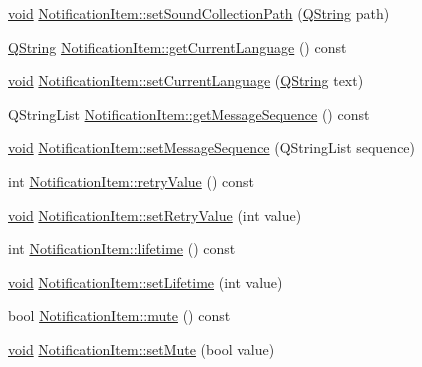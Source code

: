 \begin{DoxyCompactItemize}
\item 
\hyperlink{group___u_a_v_objects_plugin_ga444cf2ff3f0ecbe028adce838d373f5c}{void} \hyperlink{group___notify_plugin_ga51e72a159e74fc6c2f4575589caaf5b1}{\-Notification\-Item\-::set\-Sound\-Collection\-Path} (\hyperlink{group___u_a_v_objects_plugin_gab9d252f49c333c94a72f97ce3105a32d}{\-Q\-String} path)
\item 
\hyperlink{group___u_a_v_objects_plugin_gab9d252f49c333c94a72f97ce3105a32d}{\-Q\-String} \hyperlink{group___notify_plugin_ga90dda23b3c620a17440f8708a4e98241}{\-Notification\-Item\-::get\-Current\-Language} () const 
\item 
\hyperlink{group___u_a_v_objects_plugin_ga444cf2ff3f0ecbe028adce838d373f5c}{void} \hyperlink{group___notify_plugin_ga125828e3dae6986b12d315319b3ee24a}{\-Notification\-Item\-::set\-Current\-Language} (\hyperlink{group___u_a_v_objects_plugin_gab9d252f49c333c94a72f97ce3105a32d}{\-Q\-String} text)
\item 
\-Q\-String\-List \hyperlink{group___notify_plugin_gad9a4c112e8b27294870f09c7c3bf6bd8}{\-Notification\-Item\-::get\-Message\-Sequence} () const 
\item 
\hyperlink{group___u_a_v_objects_plugin_ga444cf2ff3f0ecbe028adce838d373f5c}{void} \hyperlink{group___notify_plugin_gad8bface53f8c0b678ba53efa7607c644}{\-Notification\-Item\-::set\-Message\-Sequence} (\-Q\-String\-List sequence)
\item 
int \hyperlink{group___notify_plugin_gad3ef16c40fa24c6362f0a5b8dcf7106a}{\-Notification\-Item\-::retry\-Value} () const 
\item 
\hyperlink{group___u_a_v_objects_plugin_ga444cf2ff3f0ecbe028adce838d373f5c}{void} \hyperlink{group___notify_plugin_gace1ba5eab850d1945aeede024e405463}{\-Notification\-Item\-::set\-Retry\-Value} (int value)
\item 
int \hyperlink{group___notify_plugin_ga2a7280994bcb9184ba2a3de6aa2d9dd7}{\-Notification\-Item\-::lifetime} () const 
\item 
\hyperlink{group___u_a_v_objects_plugin_ga444cf2ff3f0ecbe028adce838d373f5c}{void} \hyperlink{group___notify_plugin_gab8ee00149d5b8c0a74ff7fc134bdbd4c}{\-Notification\-Item\-::set\-Lifetime} (int value)
\item 
bool \hyperlink{group___notify_plugin_ga815fa2051096a7c2f3074c60afad5d47}{\-Notification\-Item\-::mute} () const 
\item 
\hyperlink{group___u_a_v_objects_plugin_ga444cf2ff3f0ecbe028adce838d373f5c}{void} \hyperlink{group___notify_plugin_ga45781a8ec6285e780f592f1b3952b407}{\-Notification\-Item\-::set\-Mute} (bool value)

\end{DoxyCompactItemize}
